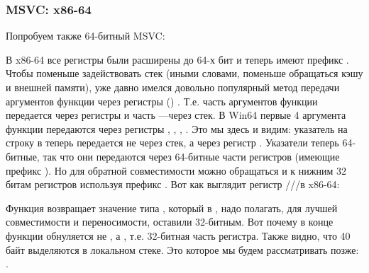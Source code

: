 \subsubsection{MSVC: x86-64}

Попробуем также 64-битный MSVC:




В x86-64 все регистры были расширены до 64-х бит и теперь имеют префикс .
Чтобы поменьше задействовать стек (иными словами, поменьше обращаться кэшу и внешней памяти), уже давно имелся
довольно популярный метод передачи аргументов функции через регистры () .
Т.е. часть аргументов функции передается через регистры и часть ---через стек.
В Win64 первые 4 аргумента функции передаются через регистры \RCX, \RDX, , .
Это мы здесь и видим: указатель на строку в \printf теперь передается не через стек, а через регистр \RCX.
Указатели теперь 64-битные, так что они передаются через 64-битные части регистров (имеющие префикс ).
Но для обратной совместимости можно обращаться и к нижним 32 битам регистров используя префикс .
Вот как выглядит регистр \RAX/\EAX/\AX/\AL в x86-64:


Функция \main возвращает значение типа \Tint, который в \CCpp, надо полагать, для лучшей совместимости и переносимости,
оставили 32-битным. Вот почему в конце функции \main обнуляется не \RAX, а \EAX, т.е. 32-битная часть регистра.
Также видно, что 40 байт выделяются в локальном стеке.
Это  которое мы будем рассматривать позже: .
